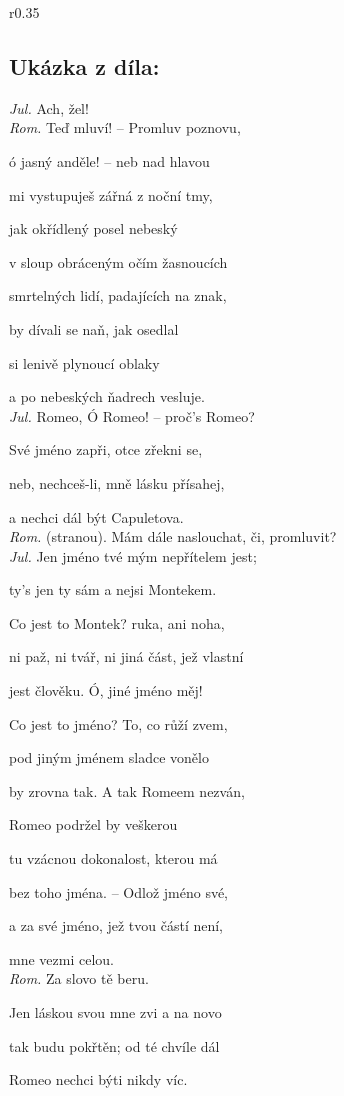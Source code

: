 \documentclass[A4paper]{extarticle} %
\begin{document}
\noindent\begin{wrapfigure}{r}{0.35\textwidth}
\tiny

\subsection*{Ukázka z díla:}
\setlength{\parindent}{3pt}
\noindent \textit{Jul.} Ach, žel! \\
\textit{Rom.} Teď mluví! -- Promluv poznovu, \par
ó jasný anděle! -- neb nad hlavou \par
mi vystupuješ zářná z noční tmy, \par
jak okřídlený posel nebeský \par
v sloup obráceným očím žasnoucích \par
smrtelných lidí, padajících na znak, \par
by dívali se naň, jak osedlal \par
si lenivě plynoucí oblaky \par
a po nebeských ňadrech vesluje. \\
\textit{Jul.} Romeo, Ó Romeo! -- proč's Romeo? \par
Své jméno zapři, otce zřekni se, \par
neb, nechceš-li, mně lásku přísahej, \par
a nechci dál být Capuletova. \\
\textit{Rom.} (stranou). Mám dále naslouchat, či, promluvit? \\
\textit{Jul.} Jen jméno tvé mým nepřítelem jest; \par
ty's jen ty sám a nejsi Montekem. \par
Co jest to Montek? ruka, ani noha, \par
ni paž, ni tvář, ni jiná část, jež vlastní \par
jest člověku. Ó, jiné jméno měj! \par
Co jest to jméno? To, co růží zvem, \par
pod jiným jménem sladce vonělo \par
by zrovna tak. A tak Romeem nezván, \par
Romeo podržel by veškerou \par
tu vzácnou dokonalost, kterou má \par
bez toho jména. -- Odlož jméno své, \par
a za své jméno, jež tvou částí není, \par
mne vezmi celou. \\
\textit{Rom.} Za slovo tě beru. \par
Jen láskou svou mne zvi a na novo \par
tak budu pokřtěn; od té chvíle dál \par
Romeo nechci býti nikdy víc. 
\end{wrapfigure}
\end{document}
